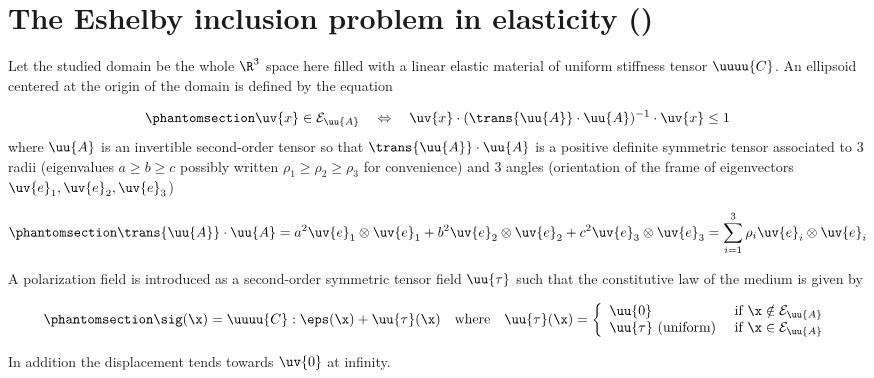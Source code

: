 \documentclass[
  letterpaper,
  DIV=11,
  numbers=noendperiod]{scrreprt}
\begin{document}
\section{\texorpdfstring{The Eshelby inclusion problem in elasticity
()}{The Eshelby inclusion problem in elasticity (Eshelby, 1957)}}\label{the-eshelby-inclusion-problem-in-elasticity-eshelby1957}

Let the studied domain be the whole \(\R^3\) space here filled with a
linear elastic material of uniform stiffness tensor \(\uuuu{C}\). An
ellipsoid centered at the origin of the domain is defined by the
equation

\begin{equation}\phantomsection\label{eq-defell}{
   \uv{x}\in\mathcal{E}_{\uu{A}}
\quad\Leftrightarrow\quad   
\uv{x}\cdot(\trans{\uu{A}}\cdot\uu{A})^{-1}\cdot\uv{x}\leq 1
}\end{equation} where \(\uu{A}\) is an invertible second-order tensor so
that \(\trans{\uu{A}}\cdot\uu{A}\) is a positive definite symmetric
tensor associated to 3 radii (eigenvalues \(a\geq b \geq c\) possibly
written \(\rho_1 \geq \rho_2 \geq \rho_3\) for convenience) and 3 angles
(orientation of the frame of eigenvectors
\(\uv{e}_1, \uv{e}_2, \uv{e}_3\))

\begin{equation}\phantomsection\label{eq-defA}{
\trans{\uu{A}}\cdot\uu{A}=a^2 \uv{e}_1\otimes\uv{e}_1 + b^2 \uv{e}_2\otimes\uv{e}_2 + c^2 \uv{e}_3\otimes\uv{e}_3 = \sum_{i=1}^3 \rho_i \uv{e}_i\otimes\uv{e}_i
}\end{equation}

A polarization field is introduced as a second-order symmetric tensor
field \(\uu{\tau}\) such that the constitutive law of the medium is
given by

\begin{equation}\phantomsection\label{eq-law}{
    \sig(\x)=\uuuu{C}:\eps(\x)+\uu{\tau}(\x)\quad\textrm{where}\quad
    \uu{\tau}(\x)=
    \left\{
    \begin{array}{ll}
    \uu{0}&\textrm{ if }\x \notin \mathcal{E}_{\uu{A}}\\
    \uu{\tau}\textrm{ (uniform)}&\textrm{ if }\x \in \mathcal{E}_{\uu{A}}
    \end{array}
    \right.
}\end{equation}

In addition the displacement tends towards \(\uv{0}\) at infinity.
\end{document}
